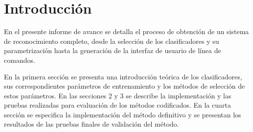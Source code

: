 \section*{Introducción}
En el presente informe de avance se detalla el proceso de obtención de
un sistema de reconocimiento completo, desde la selección de los
clasificadores y su parametrización hasta la generación de la interfaz
de usuario de línea de comandos.

En la primera sección se presenta una introducción teórica de los
clasificadores, sus correspondientes parámetros de entrenamiento y los
métodos de selección de estos parámetros. En las secciones 2 y 3 se
describe la implementación y las pruebas realizadas para evaluación de
los métodos codificados. En la cuarta sección se especifica la
implementación del método definitivo y se presentan los resultados de
las pruebas finales de validación del método.